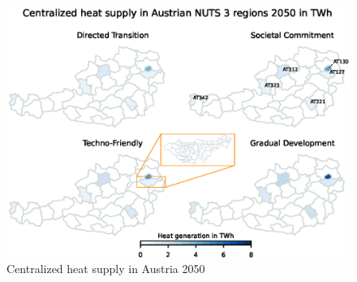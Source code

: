 \begin{figure}
	\centering
	\includegraphics[width=1\linewidth]{figures/4_Results/Heatmap.eps}
	\caption{Centralized heat supply in Austria 2050}
	\label{fig:res2}
\end{figure}

\newpage
